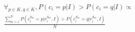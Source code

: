 \message{ !name(egpaper_for_review.tex)}\documentclass[10pt,twocolumn,letterpaper]{article}
\begin{document}
\begin{eqnarray}
\forall_{p\in{K}, q\in{K}}, P(c_i=p|I) > P(c_i=q|I) \propto \nonumber \\
\frac{\sum_{m=1}^NP(c_i^{S_m} = p|r_i^{S_m},I) > P(c_i^{S_m} =
q|r_i^{S_m},I)}{N}
\end{eqnarray}
\end{document}

